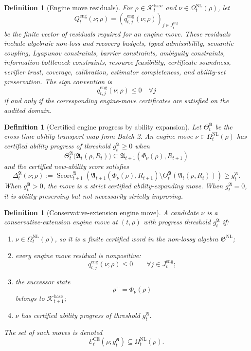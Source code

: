 \documentclass[11pt]{article}
\newtheorem{definition}[theorem]{Definition}
\newcommand{\Ecal}{\mathcal{E}}
\newcommand{\1}{\mathbf{1}}
\providecommand{\Kcal}{\mathcal{K}}
\begin{document}
\begin{definition}[Engine move residuals]
\label{def:engine_move_residuals}
For \(\rho\in\Kcal_t^{\mathrm{base}}\) and \(\nu\in\Omega_t^{\mathrm{NL}}(\rho)\), let
\[
Q_t^{\mathrm{eng}}(\nu;\rho)
=
(q_{t,j}^{\mathrm{eng}}(\nu;\rho))_{j\in J_t^{\mathrm{eng}}}
\]
be the finite vector of residuals required for an engine move.  These residuals include algebraic non-loss and recovery budgets, typed admissibility, semantic coupling, Lyapunov constraints, barrier constraints, ambiguity constraints, information-bottleneck constraints, resource feasibility, certificate soundness, verifier trust, coverage, calibration, estimator completeness, and ability-set preservation.  The sign convention is
\[
q_{t,j}^{\mathrm{eng}}(\nu;\rho)\le0
\quad\forall j
\]
if and only if the corresponding engine-move certificates are satisfied on the audited domain.
\end{definition}

\begin{definition}[Certified engine progress by ability expansion]
\label{def:certified_engine_progress_by_ability_expansion}
Let \(\Theta_t^{\mathfrak A}\) be the cross-time ability-transport map from Batch 2.  An engine move \(\nu\in\Omega_t^{\mathrm{NL}}(\rho)\) has certified ability progress of threshold \(g_t^{\mathfrak A}\ge0\) when
\[
\Theta_t^{\mathfrak A}\bigl(\mathfrak A_t(\rho,R_t)\bigr)
\subseteq
\mathfrak A_{t+1}(\Phi_\nu(\rho),R_{t+1})
\]
and the certified new-ability score satisfies
\[
\Delta_t^{\mathfrak A}(\nu;\rho)
:=
\operatorname{Score}_{t+1}^{\mathfrak A}
\left(
\mathfrak A_{t+1}(\Phi_\nu(\rho),R_{t+1})
\setminus
\Theta_t^{\mathfrak A}(\mathfrak A_t(\rho,R_t))
\right)
\ge g_t^{\mathfrak A}.
\]
When \(g_t^{\mathfrak A}>0\), the move is a strict certified ability-expanding move.  When \(g_t^{\mathfrak A}=0\), it is ability-preserving but not necessarily strictly improving.
\end{definition}

\begin{definition}[Conservative-extension engine move]
\label{def:conservative_extension_engine_move}
A candidate \(\nu\) is a conservative-extension engine move at \((t,\rho)\) with progress threshold \(g_t^{\mathfrak A}\) if:
\begin{enumerate}[label=(\roman*),leftmargin=1.5em]
    \item \(\nu\in\Omega_t^{\mathrm{NL}}(\rho)\), so it is a finite certified word in the non-lossy algebra \(\mathfrak G^{\mathrm{NL}}\);
    \item every engine move residual is nonpositive:
    \[
    q_{t,j}^{\mathrm{eng}}(\nu;\rho)\le0
    \qquad\forall j\in J_t^{\mathrm{eng}};
    \]
    \item the successor state
    \[
    \rho^+=\Phi_\nu(\rho)
    \]
    belongs to \(\Kcal_{t+1}^{\mathrm{base}}\);
    \item \(\nu\) has certified ability progress of threshold \(g_t^{\mathfrak A}\).
\end{enumerate}
The set of such moves is denoted
\[
\Ecal_t^{\mathrm{CE}}(\rho;g_t^{\mathfrak A})
\subseteq
\Omega_t^{\mathrm{NL}}(\rho).
\]
\end{definition}
\end{document}
